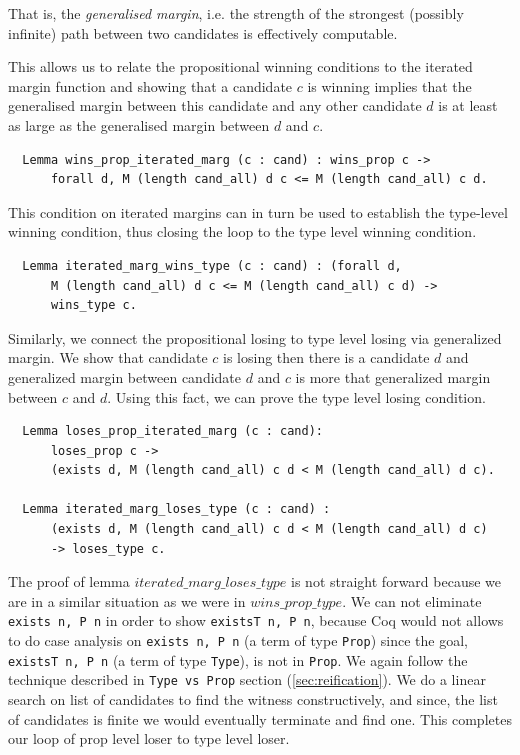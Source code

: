 \noindent
That is, the \emph{generalised margin}, i.e. the strength of the strongest (possibly infinite) path
between two candidates is effectively computable.

This allows us to relate the propositional winning conditions to the
iterated margin function and showing that a candidate $c$ is winning
implies that the generalised margin between this candidate and any
other candidate $d$ is at least as large as the generalised margin between $d$
and $c$.

\begin{verbatim}
  Lemma wins_prop_iterated_marg (c : cand) : wins_prop c ->
      forall d, M (length cand_all) d c <= M (length cand_all) c d.
\end{verbatim}

\noindent
This condition on iterated margins can in turn be used to establish the
type-level winning condition, thus closing the loop to the type
level winning condition.

\begin{verbatim}
  Lemma iterated_marg_wins_type (c : cand) : (forall d,
      M (length cand_all) d c <= M (length cand_all) c d) ->
      wins_type c.
\end{verbatim}

Similarly, we connect the propositional losing to type level losing via generalized margin. We show that 
candidate $c$ is losing then there is a candidate $d$ and generalized margin between candidate $d$ and 
$c$ is more that generalized margin between $c$ and $d$.  Using this fact, we can prove the 
type level losing condition. 

\begin{verbatim} 
  Lemma loses_prop_iterated_marg (c : cand):
      loses_prop c ->
      (exists d, M (length cand_all) c d < M (length cand_all) d c).

  Lemma iterated_marg_loses_type (c : cand) :
      (exists d, M (length cand_all) c d < M (length cand_all) d c) 
      -> loses_type c.
\end{verbatim}


The proof of lemma  $iterated\_marg\_loses\_type$ is not straight forward because
we are in a similar situation  as we were in $wins\_prop\_type$. 
We can not eliminate \texttt{exists n, P n} in order to show \texttt{existsT n, P n},
because Coq would not allows to do case analysis on \texttt{exists n, P n} (a term of 
type \texttt{Prop}) since the goal, \texttt{existsT n, P n} (a term of type \texttt{Type}), is not in
\texttt{Prop}. We again follow the technique described in 
\texttt{Type vs Prop} section (\ref{sec:reification}).
We do  a linear search on list of candidates  to find the witness constructively, and since, 
the list of candidates is  finite we would eventually terminate and find one.  
This completes our loop of prop level loser to type level loser. 


